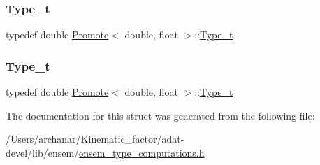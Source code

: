 \subsubsection{\texorpdfstring{Type\_t}{Type\_t}\hspace{0.1cm}{\footnotesize\ttfamily [2/3]}}
{\footnotesize\ttfamily typedef double \mbox{\hyperlink{structPromote}{Promote}}$<$ double, float $>$\+::\mbox{\hyperlink{structPromote_3_01double_00_01float_01_4_a13a1db5ec3dbe8a0dbe04bfa1602202c}{Type\+\_\+t}}}

\mbox{\label{structPromote_3_01double_00_01float_01_4_a13a1db5ec3dbe8a0dbe04bfa1602202c}} 
\subsubsection{\texorpdfstring{Type\_t}{Type\_t}\hspace{0.1cm}{\footnotesize\ttfamily [3/3]}}
{\footnotesize\ttfamily typedef double \mbox{\hyperlink{structPromote}{Promote}}$<$ double, float $>$\+::\mbox{\hyperlink{structPromote_3_01double_00_01float_01_4_a13a1db5ec3dbe8a0dbe04bfa1602202c}{Type\+\_\+t}}}



The documentation for this struct was generated from the following file\+:\begin{DoxyCompactItemize}
\item 
/\+Users/archanar/\+Kinematic\+\_\+factor/adat-\/devel/lib/ensem/\mbox{\hyperlink{adat-devel_2lib_2ensem_2ensem__type__computations_8h}{ensem\+\_\+type\+\_\+computations.\+h}}\end{DoxyCompactItemize}
